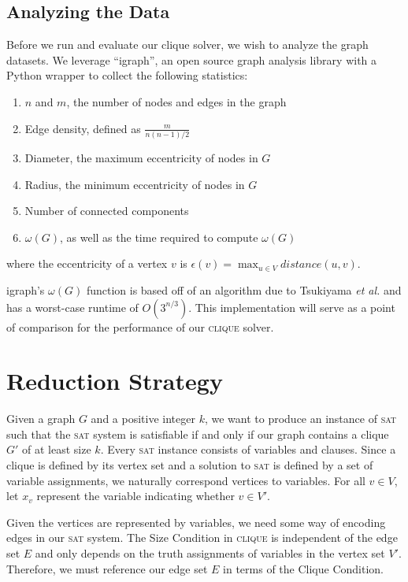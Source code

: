 \documentclass[]{article}
\newcommand{\clique}{\textsc{clique}}
\newcommand{\sat}{\textsc{sat}}
\begin{document}
	\subsection{Analyzing the Data}
	Before we run and evaluate our clique solver, we wish to analyze the graph datasets. We leverage ``igraph'', an open source graph analysis library with a Python wrapper to collect the following statistics:
	\begin{enumerate}
		\item $n$ and $m$, the number of nodes and edges in the graph
		\item Edge density, defined as $\frac{m}{n (n - 1) / 2}$
		\item Diameter, the maximum eccentricity of nodes in $G$
		\item Radius, the minimum eccentricity of nodes in $G$
		\item Number of connected components
		\item $\omega(G)$, as well as the time required to compute $\omega(G)$
	\end{enumerate}
	where the eccentricity of a vertex $v$ is $\epsilon(v) = \max_{u \in V} distance(u, v)$.
	
	igraph's $\omega(G)$ function is based off of an algorithm due to Tsukiyama \textit{et al.}\cite{doi:10.1137/0206036} and has a worst-case runtime of $O\left(3^{n/3}\right)$\cite{igraph2016}. This implementation will serve as a point of comparison for the performance of our \clique{} solver.
	
	\section{Reduction Strategy}
	Given a graph $G$ and a positive integer $k$, we want to produce an instance of \sat{} such that the \sat{} system is satisfiable if and only if our graph contains a clique $G'$ of at least size $k$. Every \sat{} instance consists of variables and clauses. Since a clique is defined by its vertex set and a solution to \sat{} is defined by a set of variable assignments, we naturally correspond vertices to variables. For all $v \in V$, let $x_v$ represent the variable indicating whether $v \in V'$.
	 
	Given the vertices are represented by variables, we need some way of encoding edges in our \sat{} system. The Size Condition in \clique{} is independent of the edge set $E$ and only depends on the truth assignments of variables in the vertex set $V'$. Therefore, we must reference our edge set $E$ in terms of the Clique Condition.
	
\end{document}
